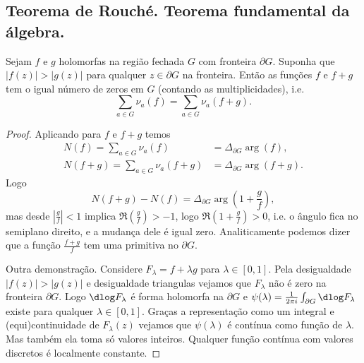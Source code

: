 \subsection{Teorema de Rouché. Teorema fundamental da álgebra.}

\begin{teorema}[Rouché]
\label{t:rouche}
Sejam $f$ e $g$ holomorfas na região fechada $G$ com fronteira $\partial G$.
Suponha que $|f(z)| > |g(z)|$ para qualquer $z\in\partial G$ na fronteira.
Então as funções $f$ e $f+g$ tem o igual número de zeros em $G$ (contando as multiplicidades), i.e.
\[ \sum_{a\in G} \nu_a(f) = \sum_{a\in G} \nu_a(f+g) .\]
\end{teorema}
\begin{proof}
Aplicando  para $f$ e $f+g$ temos
\begin{align*}
N(f) = \sum_{a\in G} \nu_a(f)   &= \Delta_{\partial G} \arg(f),\\
N(f+g) =\sum_{a\in G} \nu_a(f+g) &= \Delta_{\partial G} \arg(f+g).
\end{align*}
Logo
\[ N(f+g)-N(f) = \Delta_{\partial G} \arg(1+\frac{g}{f}), \]
mas desde $|\frac{g}{f}| < 1$ implica $\Re(\frac{g}{f})>-1$,
logo $\Re(1+\frac{g}{f}) > 0$, i.e. o ângulo fica no semiplano direito,
e a mudança dele é igual zero. Analiticamente podemos dizer que a função $\frac{f+g}{f}$
tem uma primitiva no $\partial G$.

Outra demonstração. Considere $F_\lambda = f + \lambda g$ para $\lambda\in[0,1]$.
Pela desigualdade $|f(z)| > |g(z)|$ e desigualdade triangulas
vejamos que $F_\lambda$ não é zero na fronteira $\partial G$.
Logo $\dlog F_\lambda$ é forma holomorfa na $\partial G$
e $\psi(\lambda) = \frac{1}{2\pi i} \int_{\partial G} \dlog F_\lambda$ existe para qualquer $\lambda\in[0,1]$.
Graças a representação como um integral e (equi)continuidade de $F_\lambda(z)$
vejamos que $\psi(\lambda)$ é contínua como função de $\lambda$. Mas também ela toma só valores inteiros.
Qualquer função contínua com valores discretos é localmente constante.
\end{proof}

